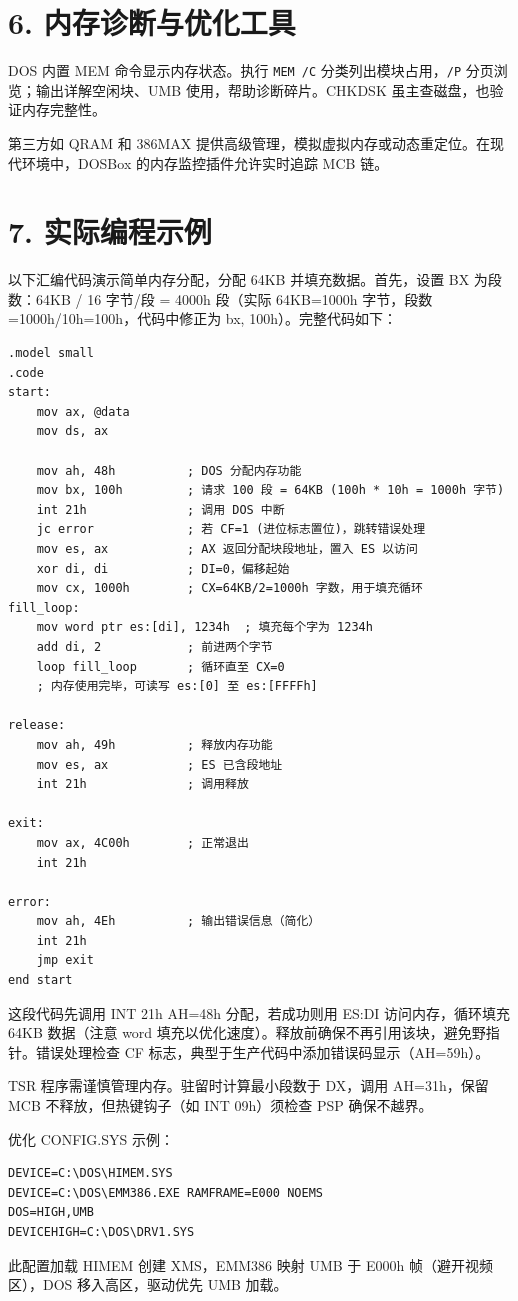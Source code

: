 \chapter{6. 内存诊断与优化工具}
DOS 内置 MEM 命令显示内存状态。执行 \texttt{MEM /C} 分类列出模块占用，\texttt{/P} 分页浏览；输出详解空闲块、UMB 使用，帮助诊断碎片。CHKDSK 虽主查磁盘，也验证内存完整性。\par
第三方如 QRAM 和 386MAX 提供高级管理，模拟虚拟内存或动态重定位。在现代环境中，DOSBox 的内存监控插件允许实时追踪 MCB 链。\par
\chapter{7. 实际编程示例}
以下汇编代码演示简单内存分配，分配 64KB 并填充数据。首先，设置 BX 为段数：64KB / 16 字节/段 = 4000h 段（实际 64KB=1000h 字节，段数 =1000h/10h=100h，代码中修正为 bx, 100h）。完整代码如下：\par
\begin{lstlisting}[language=assembly]
.model small
.code
start:
    mov ax, @data
    mov ds, ax
    
    mov ah, 48h          ; DOS 分配内存功能
    mov bx, 100h         ; 请求 100 段 = 64KB (100h * 10h = 1000h 字节)
    int 21h              ; 调用 DOS 中断
    jc error             ; 若 CF=1 (进位标志置位)，跳转错误处理
    mov es, ax           ; AX 返回分配块段地址，置入 ES 以访问
    xor di, di           ; DI=0，偏移起始
    mov cx, 1000h        ; CX=64KB/2=1000h 字数，用于填充循环
fill_loop:
    mov word ptr es:[di], 1234h  ; 填充每个字为 1234h
    add di, 2            ; 前进两个字节
    loop fill_loop       ; 循环直至 CX=0
    ; 内存使用完毕，可读写 es:[0] 至 es:[FFFFh]
    
release:
    mov ah, 49h          ; 释放内存功能
    mov es, ax           ; ES 已含段地址
    int 21h              ; 调用释放
    
exit:
    mov ax, 4C00h        ; 正常退出
    int 21h
    
error:
    mov ah, 4Eh          ; 输出错误信息（简化）
    int 21h
    jmp exit
end start
\end{lstlisting}
这段代码先调用 INT 21h AH=48h 分配，若成功则用 ES:DI 访问内存，循环填充 64KB 数据（注意 word 填充以优化速度）。释放前确保不再引用该块，避免野指针。错误处理检查 CF 标志，典型于生产代码中添加错误码显示（AH=59h）。\par
TSR 程序需谨慎管理内存。驻留时计算最小段数于 DX，调用 AH=31h，保留 MCB 不释放，但热键钩子（如 INT 09h）须检查 PSP 确保不越界。\par
优化 CONFIG.SYS 示例：\par
\begin{lstlisting}
DEVICE=C:\DOS\HIMEM.SYS
DEVICE=C:\DOS\EMM386.EXE RAMFRAME=E000 NOEMS
DOS=HIGH,UMB
DEVICEHIGH=C:\DOS\DRV1.SYS
\end{lstlisting}
此配置加载 HIMEM 创建 XMS，EMM386 映射 UMB 于 E000h 帧（避开视频区），DOS 移入高区，驱动优先 UMB 加载。\par
